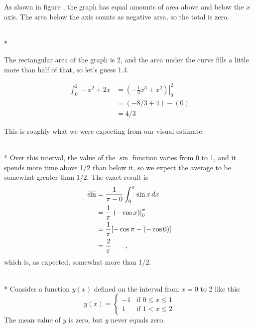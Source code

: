 As shown in  figure , the graph has equal amounts of area above and below the $x$ axis.
The area below the axis counts as negative area, so the total is zero.

\\*

The rectangular area of the graph is 2, and the area under the curve fills a little more than half of that, so let's guess 1.4.

\begin{align*}
  \int_0^2 -x^2+2x &= \left.\left(-\frac{1}{3}x^3+x^2\right)\right|_0^2 \\
             &= (-8/3+4)-(0) \\
             &= 4/3
\end{align*}

This is roughly what we were expecting from our visual estimate.

\\*
Over this interval, the value of the $\sin$ function varies from 0 to 1, and
it spends more time above 1/2 than below it, so we expect the average to be
somewhat greater than 1/2.
The exact result is
\begin{align*}
  \overline{\sin} &= \frac{1}{\pi-0}\int_0^\pi \sin x\mathop{d\!} x \\
             &= \frac{1}{\pi}\left.(- \cos x)\right|_0^\pi \\
             &= \frac{1}{\pi}[-\cos\pi-(-\cos 0)] \\
             &= \frac{2}{\pi} \qquad ,
\end{align*}
which is, as expected, somewhat more than 1/2.

\\*
Consider a function $y(x)$ defined on the interval from $x=0$ to 2 like this:
\begin{equation*}
  y(x) = 
    \begin{cases}
      -1  & \text{if $0\le x \le 1$}\\
      1  & \text{if $1< x \le 2$}
    \end{cases}
\end{equation*}
The mean value of $y$ is zero, but $y$ never equals zero.

